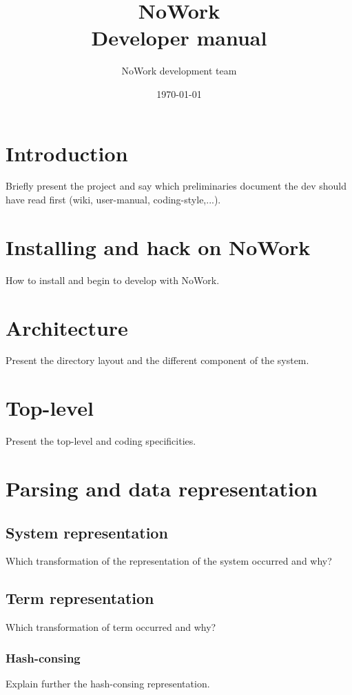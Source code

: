 \documentclass[12pt,a4paper]{article}
\title{NoWork\\
Developer manual}
\author{NoWork development team\\[2em]}
\date\today
\begin{document}
\maketitle

\section{Introduction}
Briefly present the project and say which preliminaries document the dev should have read first (wiki, user-manual, coding-style,...).

\section{Installing and hack on NoWork}
How to install and begin to develop with NoWork.

\section{Architecture}
Present the directory layout and the different component of the system.

\section{Top-level}
Present the top-level and coding specificities.

\section{Parsing and data representation}

\subsection{System representation}
Which transformation of the representation of the system occurred and why?

\subsection{Term representation}
Which transformation of term occurred and why?

\subsubsection{Hash-consing}
Explain further the hash-consing representation.
\end{document}
